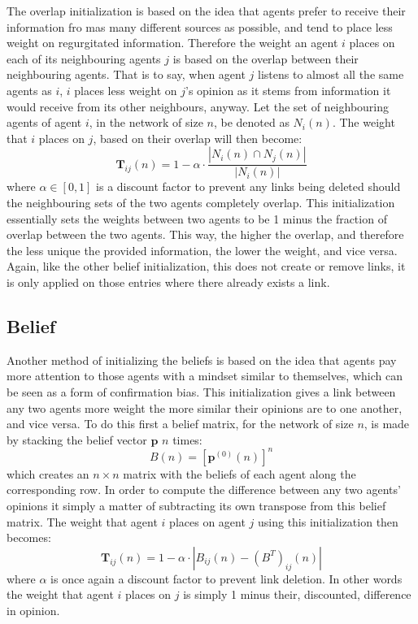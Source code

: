 \documentclass{article}
\newcommand{\T}{\textbf{T}}
\begin{document}
The overlap initialization is based on the idea that agents prefer to receive their information fro mas many different sources as possible, and tend to place less weight on regurgitated information. Therefore the weight an agent $i$ places on each of its neighbouring agents $j$ is based on the overlap between their neighbouring agents. That is to say, when agent $j$ listens to almost all the same agents as $i$, $i$ places less weight on $j$'s opinion as it stems from information it would receive from its other neighbours, anyway. Let the set of neighbouring agents of agent $i$, in the network of size $n$, be denoted as $N_i(n)$. The weight that $i$ places on $j$, based on their overlap will then become:
\begin{equation}
    \T_{ij}(n) = 1 - \alpha \cdot \frac{|N_i(n) \cap N_j(n)|}{|N_i(n)|}
\end{equation}
where $\alpha \in [0, 1]$ is a discount factor to prevent any links being deleted should the neighbouring sets of the two agents completely overlap. This initialization essentially sets the weights between two agents to be 1 minus the fraction of overlap between the two agents. This way, the higher the overlap, and therefore the less unique the provided information, the lower the weight, and vice versa. Again, like the other belief initialization, this does not create or remove links, it is only applied on those entries where there already exists a link.

\newpage

\subsection{Belief}

Another method of initializing the beliefs is based on the idea that agents pay more attention to those agents with a mindset similar to themselves, which can be seen as a form of confirmation bias. This initialization gives a link between any two agents more weight the more similar their opinions are to one another, and vice versa. To do this first a belief matrix, for the network of size $n$, is made  by stacking the belief vector $\textbf{p}$ $n$ times:
\begin{equation}
    B(n) = [\textbf{p}^{(0)}(n)]^{n}
\end{equation}
which creates an $n \times n$ matrix with the beliefs of each agent along the corresponding row. In order to compute the difference between any two agents' opinions it simply a matter of subtracting its own transpose from this belief matrix.
The weight that agent $i$ places on agent $j$ using this initialization then becomes:
\begin{equation}
    \T_{ij}(n) = 1 - \alpha \cdot |B_{ij}(n) - (B^{T})_{ij}(n)|
\end{equation}
where $\alpha$ is once again a discount factor to prevent link deletion. In other words the weight that agent $i$ places on $j$ is simply 1 minus their, discounted, difference in opinion.
\end{document}
